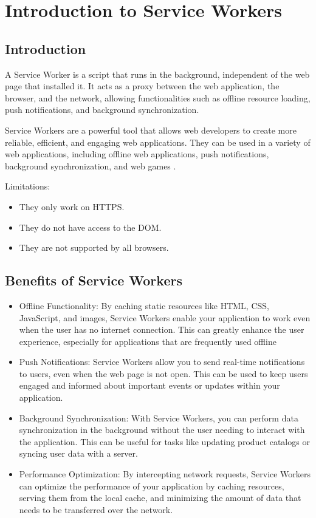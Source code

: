 \documentclass{report}
\begin{document}


\tableofcontents

\chapter{Introduction to Service Workers}\label{Introduction to Service Workers}
\section{Introduction}\label{intro}
A Service Worker is a script that runs in the background, independent of the web page that installed it. It acts as a proxy between the web application, the browser, and the network, allowing functionalities such as offline resource loading, push notifications, and background synchronization.

Service Workers are a powerful tool that allows web developers to create more reliable, efficient, and engaging web applications. They can be used in a variety of web applications, including offline web applications, push notifications, background synchronization, and web games .\cite{google23} \cite{mozilla23}

Limitations:
\begin{itemize}
    \item They only work on HTTPS.
    \item They do not have access to the DOM.
    \item They are not supported by all browsers.
\end{itemize}
\section{Benefits of Service Workers}\label{Benefits of Service Workers}
\begin{itemize}
    \item Offline Functionality: By caching static resources like HTML, CSS, JavaScript, and images, Service Workers enable your application to work even when the user has no internet connection. This can greatly enhance the user experience, especially for applications that are frequently used offline
    \item Push Notifications: Service Workers allow you to send real-time notifications to users, even when the web page is not open. This can be used to keep users engaged and informed about important events or updates within your application.
    \item Background Synchronization: With Service Workers, you can perform data synchronization in the background without the user needing to interact with the application. This can be useful for tasks like updating product catalogs or syncing user data with a server.
    \item Performance Optimization: By intercepting network requests, Service Workers can optimize the performance of your application by caching resources, serving them from the local cache, and minimizing the amount of data that needs to be transferred over the network.
\end{itemize}
\end{document}
